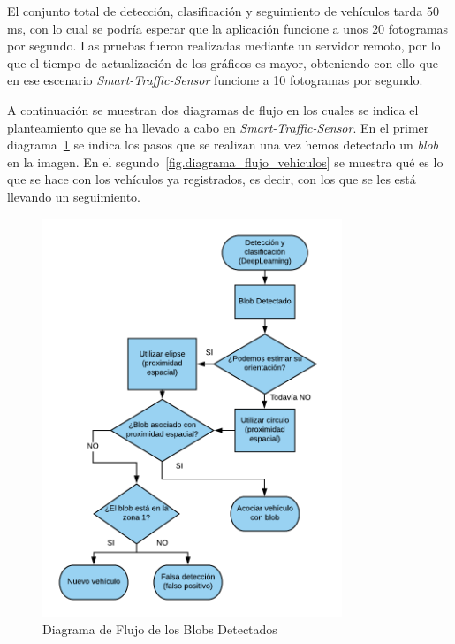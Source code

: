 El conjunto total de detección, clasificación y seguimiento de vehículos tarda 50 ms, con lo cual se podría esperar que la aplicación funcione a unos 20 fotogramas por segundo. Las pruebas fueron realizadas mediante un servidor remoto, por lo que el tiempo de actualización de los gráficos es mayor, obteniendo con ello que en ese escenario \textit{Smart-Traffic-Sensor} funcione a 10 fotogramas por segundo. 

A continuación se muestran dos diagramas de flujo en los cuales se indica el planteamiento que se ha llevado a cabo en \textit{Smart-Traffic-Sensor}. En el primer diagrama~\ref{fig.diagrama_flujo_blob} se indica los pasos que se realizan una vez hemos detectado un \textit{blob} en la imagen. En el segundo~\ref{fig.diagrama_flujo_vehiculos} se muestra qué es lo que se hace con los vehículos ya registrados, es decir, con los que se les está llevando un seguimiento.

\begin{figure}[H] 
\begin{center}
	\includegraphics[width=0.8\textwidth]{figures/Diseno_global/diagrama_flujo.png}
   \caption{Diagrama de Flujo de  los Blobs Detectados}
	\label{fig.diagrama_flujo_blob}
\end{center}
\end{figure}

